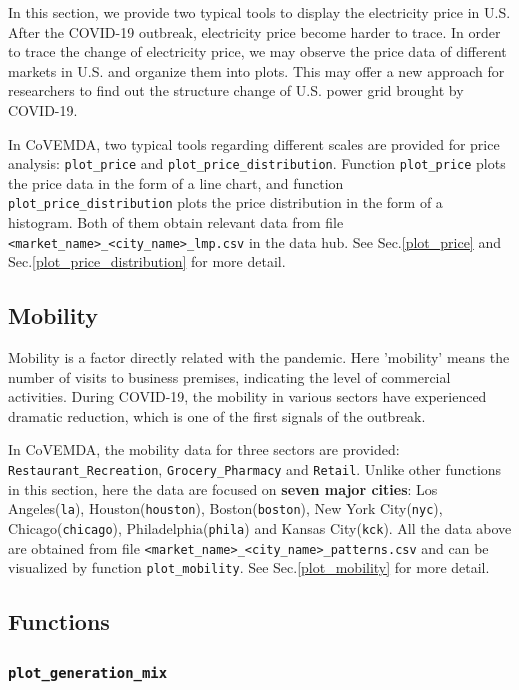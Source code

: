 \documentclass[10pt]{article}
\newcommand{\covemda}{CoVEMDA}
\numberwithin{equation}{section}
\numberwithin{table}{section}
\numberwithin{figure}{section}
\begin{document}
In this section, we provide two typical tools to display the electricity price in U.S. After the COVID-19 outbreak, electricity price become harder to trace. In order to trace the change of electricity price, we may observe the price data of different markets in U.S. and organize them into plots. This may offer a new approach for researchers to find out the structure change of U.S. power grid brought by COVID-19.

In \covemda{}, two typical tools regarding different scales are provided for price analysis: \verb!plot_price! and \verb!plot_price_distribution!. Function \verb!plot_price! plots the price data in the form of a line chart, and function \verb!plot_price_distribution! plots the price distribution in the form of a histogram. Both of them obtain relevant data from file \\\verb!<market_name>_<city_name>_lmp.csv! in the data hub. See Sec.\ref{plot_price} and Sec.\ref{plot_price_distribution} for more detail.



\subsection{Mobility}

Mobility is a factor directly related with the pandemic. Here 'mobility' means the number of visits to business premises, indicating the level of commercial activities. During COVID-19, the mobility in various sectors have experienced dramatic reduction, which is one of the first signals of the outbreak.

In \covemda{}, the mobility data for three sectors are provided: \verb!Restaurant_Recreation!, \verb!Grocery_Pharmacy! and \verb!Retail!. Unlike other functions in this section, here the data are focused on \textbf{seven major cities}: Los Angeles(\verb!la!), Houston(\verb!houston!), Boston(\verb!boston!), New York City(\verb!nyc!), Chicago(\verb!chicago!), Philadelphia(\verb!phila!) and Kansas City(\verb!kck!). All the data above are obtained from file \verb!<market_name>_<city_name>_patterns.csv! and can be visualized by function \verb!plot_mobility!. See Sec.\ref{plot_mobility} for more detail.



\subsection{Functions}

\subsubsection{\texttt{plot\_generation\_mix}}\label{func:plot_generation_mix}
\end{document}
